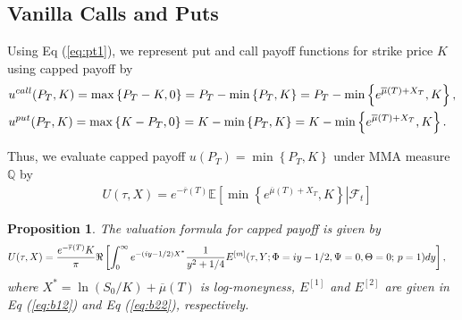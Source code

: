 \documentclass[11pt,a4paper] {article}
\newtheorem{proposition}{Proposition}[section]
\begin{document}
\subsection{Vanilla Calls and Puts}

Using Eq (\ref{eq:pt1}), we represent put and call payoff functions for strike price $K$ using capped payoff by
\begin{equation} \label {eq:v1}
\begin{split}
  & u^{call}(P_{T},K) = \max\left\{P_{T}-K, 0\right\}=P_{T}- \min\left\{P_{T}, K\right\}=P_{T}-\min\left\{e^{\overline{\mu}(T)+X_{T}},K\right\},\\
	& u^{put}(P_{T},K) = \max\left\{K-P_{T}, 0\right\}=K - \min\left\{P_{T}, K\right\} = K - \min\left\{e^{\overline{\mu}(T)+X_{T}},K\right\}.\vspace*{-1.0\baselineskip}
\end{split} 
\end{equation}

Thus, we evaluate capped payoff $u(P_{T})=\min\left\{P_{T}, K\right\}$ under MMA measure $\mathbb{Q}$ by
\begin{equation} \label {eq:v2}
\begin{split}
  & U(\tau, X) = e^{-\overline{r}(T)}\mathbb{E}\left[\left. \min\left\{e^{\overline{\mu}(T)+X_{T}},K\right\}\right|\mathcal{F}_{t}\right]
\end{split} 
\end{equation}

\begin{proposition}\label{sc:capped}
The valuation formula for capped payoff is given by
\begin{equation} \label {eq:v8}
\begin{split}
  U(\tau, X)&  = \frac{e^{-\overline{r}(T)} K}{\pi} \Re\left[\int^{\infty}_{0} e^{-(iy-1/2) X^{*}}  \frac{1}{y^{2}+1/4} E^{[m]}(\tau,Y; \Phi=iy-1/2,\Psi=0,\Theta=0;\,p=1)dy\right],\vspace*{-1\baselineskip}
\end{split} 
\end{equation}
where $X^{*}=\ln(S_{0}/K)+\overline{\mu}(T)$ is log-moneyness, $E^{[1]}$ and $E^{[2]}$ are given in Eq (\ref{eq:b12}) and Eq (\ref{eq:b22}), respectively.
\end{proposition}
\end{document}

